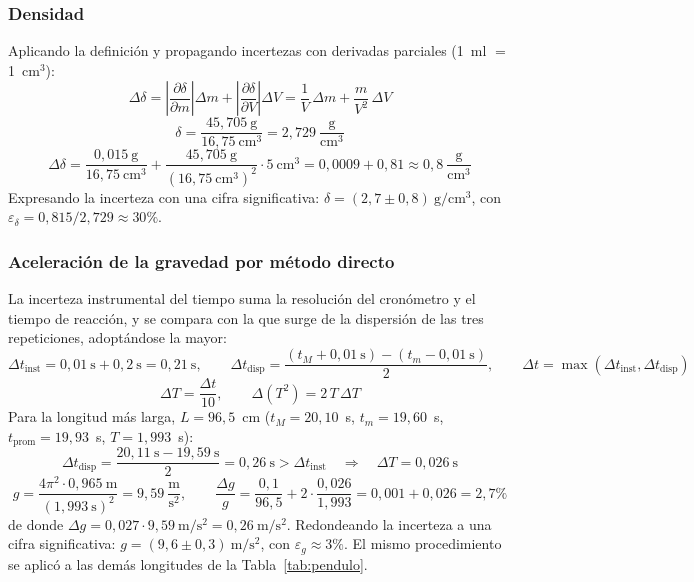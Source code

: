 \documentclass[12pt,a4paper]{article}
\begin{document}
\subsubsection{Densidad}
Aplicando la definición y propagando incertezas con derivadas parciales
(1~ml $=$ 1~cm$^3$):
\[
  \Delta\delta = \left|\frac{\partial\delta}{\partial m}\right| \Delta m
               + \left|\frac{\partial\delta}{\partial V}\right| \Delta V
               = \frac{1}{V}\,\Delta m + \frac{m}{V^2}\,\Delta V
\]
\[
  \delta = \frac{45{,}705\ \mathrm{g}}{16{,}75\ \mathrm{cm^3}} = 2{,}729\ \frac{\mathrm{g}}{\mathrm{cm^3}}
\]
\[
  \Delta\delta = \frac{0{,}015\ \mathrm{g}}{16{,}75\ \mathrm{cm^3}}
               + \frac{45{,}705\ \mathrm{g}}{\left(16{,}75\ \mathrm{cm^3}\right)^2} \cdot 5\ \mathrm{cm^3}
               = 0{,}0009 + 0{,}81 \approx 0{,}8\ \frac{\mathrm{g}}{\mathrm{cm^3}}
\]
Expresando la incerteza con una cifra significativa:
$\delta = (2{,}7 \pm 0{,}8)\ \mathrm{g/cm^3}$, con
$\varepsilon_\delta = 0{,}815 / 2{,}729 \approx 30\%$.

\subsubsection{Aceleración de la gravedad por método directo}
La incerteza instrumental del tiempo suma la resolución del cronómetro y el tiempo de
reacción, y se compara con la que surge de la dispersión de las tres repeticiones,
adoptándose la mayor:
\[
  \Delta t_{\text{inst}} = 0{,}01\ \mathrm{s} + 0{,}2\ \mathrm{s} = 0{,}21\ \mathrm{s},
  \qquad
  \Delta t_{\text{disp}} = \frac{(t_M + 0{,}01\ \mathrm{s}) - (t_m - 0{,}01\ \mathrm{s})}{2},
  \qquad
  \Delta t = \max(\Delta t_{\text{inst}}, \Delta t_{\text{disp}})
\]
\[
  \Delta T = \frac{\Delta t}{10},
  \qquad
  \Delta (T^2) = 2\,T\,\Delta T
\]
Para la longitud más larga, $L = 96{,}5$~cm ($t_M = 20{,}10$~s, $t_m = 19{,}60$~s,
$t_{\text{prom}} = 19{,}93$~s, $T = 1{,}993$~s):
\[
  \Delta t_{\text{disp}} = \frac{20{,}11\ \mathrm{s} - 19{,}59\ \mathrm{s}}{2} = 0{,}26\ \mathrm{s}
  > \Delta t_{\text{inst}}
  \quad\Rightarrow\quad
  \Delta T = 0{,}026\ \mathrm{s}
\]
\[
  g = \frac{4\pi^2 \cdot 0{,}965\ \mathrm{m}}{(1{,}993\ \mathrm{s})^2}
      = 9{,}59\ \frac{\mathrm{m}}{\mathrm{s^2}},
  \qquad
  \frac{\Delta g}{g} = \frac{0{,}1}{96{,}5} + 2 \cdot \frac{0{,}026}{1{,}993}
                     = 0{,}001 + 0{,}026 = 2{,}7\%
\]
de donde $\Delta g = 0{,}027 \cdot 9{,}59\ \mathrm{m/s^2} = 0{,}26\ \mathrm{m/s^2}$. Redondeando
la incerteza a una cifra significativa: $g = (9{,}6 \pm 0{,}3)\ \mathrm{m/s^2}$, con
$\varepsilon_g \approx 3\%$. El
mismo procedimiento se aplicó a las demás longitudes de la Tabla~\ref{tab:pendulo}.
\end{document}
